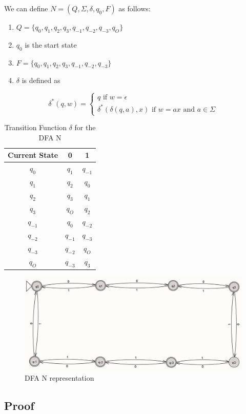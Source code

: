 \documentclass[12pt]{article}
\begin{document}
We can define $N = (Q, \Sigma, \delta, q_0, F)$ as follows:
\begin{enumerate}
\item $Q =  \{q_0, q_1, q_2, q_3, q_{-1}, q_{-2}, q_{-3}, q_O\}$
\item $q_0$ is the start state
\item $F = \{  q_0, q_1, q_2, q_3, q_{-1}, q_{-2}, q_{-3}\}$
\item $\delta$ is defined as 
\end{enumerate}
  \[
\delta^*(q, w) =
\begin{cases}
q \text{ if } w = \epsilon  \\
\delta^*(\delta(q, a), x) \text{ if } w=ax \text{ and } a \in \Sigma
\end{cases}
\]
\begin{table}[h]
\centering
\begin{tabular}{|c|c|c|}
\hline
\textbf{Current State} & \textbf{0}& \textbf{1}\\
\hline
$q_0$ & $q_1$& $q_{-1}$\\
$q_1$ & $q_2$& $q_0$\\
$q_2$ & $q_3$& $q_1$\\
 $q_3$& $q_O$&$q_2$\\
$q_{-1}$& $q_0$& $q_{-2}$\\
$q_{-2}$& $q_{-1}$& $q_{-3}$\\
$q_{-3}$& $q_{-2}$& $q_O$\\
$q_O$& $q_{-3}$& $q_3$\\
\hline
\end{tabular}
\caption{ Transition Function $\delta$ for the DFA N}
\end{table}

\begin{figure}
    \centering
    \includegraphics[width=0.75\linewidth]{Tarea 2 DFA 2.f.jpg}
    \caption{DFA N representation}
    \label{DFA N}
\end{figure}

\subsection{Proof} 
\end{document}
